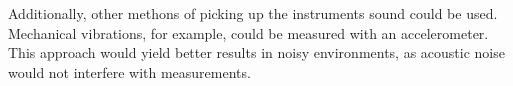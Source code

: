 \documentclass[a4paper, 12pt]{article}
\begin{document}
Additionally, other methons of picking up the instruments sound could be used. Mechanical vibrations, for example, could be measured with an accelerometer. This approach would yield better results in noisy environments, as acoustic noise would not interfere with measurements.

\clearpage
\sloppy
\printbibliography
\end{document}
